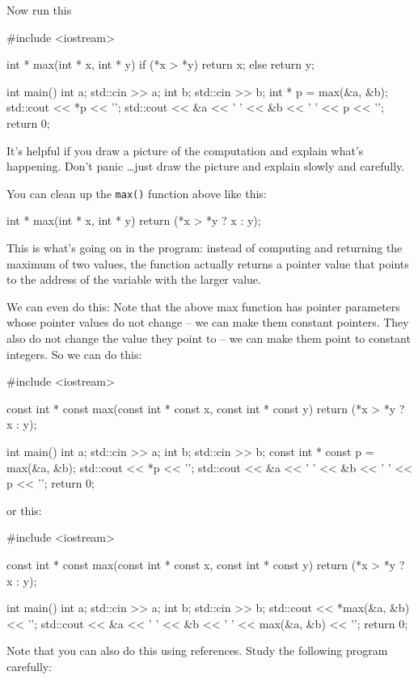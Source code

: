 Now run this

\begin{consolethree}[escapeinside=||]
#include <iostream>

int * max(int * x, int * y)
{
    if (*x > *y)
    {
        return x;
    }
    else
    {
        return y;
    }
}

int main()
{
    int a;
    std::cin >> a;
    int b;
    std::cin >> b;
    int * p = max(&a, &b);
    std::cout << *p << '\n';
    std::cout << &a << ' ' << &b
              << ' ' << p << '\n';
    return 0;
}
\end{consolethree}
It's helpful if you draw a picture of the computation and explain what's happening. Don't panic \ldots just draw the picture and explain slowly and carefully.

You can clean up the \texttt{max()} function above like this:

\begin{consolethree}[escapeinside=||]
int * max(int * x, int * y)
{
    return (*x > *y ? x : y);
}
\end{consolethree}
This is what's going on in the program: instead of computing and returning the maximum of two values, the function actually returns a pointer value that points to the address of the variable with the larger value.

We can even do this: Note that the above max function has pointer parameters whose pointer values do not change -- we can make them constant pointers. They also do not change the value they point to -- we can make them point to constant integers. So we can do this:

\begin{consolethree}[escapeinside=||]
#include <iostream>

const int * const max(const int * const x,
                      const int * const y)
{
    return (*x > *y ? x : y);
}

int main()
{
    int a;
    std::cin >> a;
    int b;
    std::cin >> b;
    const int * const p = max(&a, &b);
    std::cout << *p << '\n';
    std::cout << &a << ' ' << &b << ' '
              << p << '\n';
    return 0;
}
\end{consolethree}
or this:

\begin{consolethree}[escapeinside=||]
#include <iostream>

const int * const max(const int * const x,
                      const int * const y)
{
    return (*x > *y ? x : y);
}

int main()
{
    int a;
    std::cin >> a;
    int b;
    std::cin >> b;
    std::cout << *max(&a, &b) << '\n';
    std::cout << &a << ' ' << &b << ' '
                    << max(&a, &b) << '\n';
    return 0;
}
\end{consolethree}
Note that you can also do this using references. Study the following program carefully:

